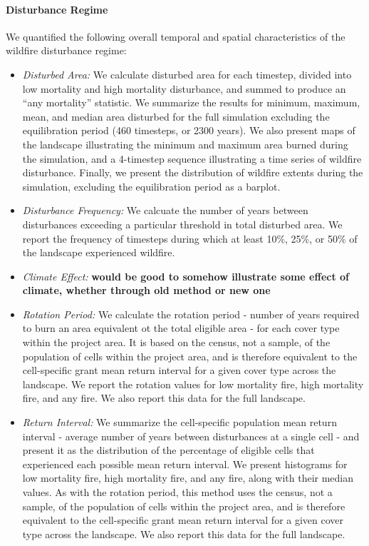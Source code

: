 \paragraph{Disturbance Regime} We quantified the following overall temporal and spatial characteristics of the wildfire disturbance regime:
\begin{itemize}
	\item \emph{Disturbed Area:} We calculate disturbed area for each timestep, divided into low mortality and high mortality disturbance, and summed to produce an ``any mortality'' statistic. We summarize the results for minimum, maximum, mean, and median area disturbed for the full simulation excluding the equilibration period (460 timesteps, or 2300 years). We also present maps of the landscape illustrating the minimum and maximum area burned during the simulation, and a 4-timestep sequence illustrating a time series of wildfire disturbance. Finally, we present the distribution of wildfire extents during the simulation, excluding the equilibration period as a barplot.
	\item \emph{Disturbance Frequency:} We calcuate the number of years between disturbances exceeding a particular threshold in total disturbed area. We report the frequency of timesteps during which at least 10\%, 25\%, or 50\% of the landscape experienced wildfire.
	\item \emph{Climate Effect:} \textbf{would be good to somehow illustrate some effect of climate, whether through old method or new one}
	\item \emph{Rotation Period:} We calculate the rotation period - number of years required to burn an area equivalent ot the total eligible area - for each cover type within the project area. It is based on the census, not a sample, of the population of cells within the project area, and is therefore equivalent to the cell-specific grant mean return interval for a given cover type across the landscape. We report the rotation values for low mortality fire, high mortality fire, and any fire. We also report this data for the full landscape.
	\item \emph{Return Interval:} We summarize the cell-specific population mean return interval - average number of years between disturbances at a single cell - and present it as the distribution of the percentage of eligible cells that experienced each possible mean return interval. We present histograms for low mortality fire, high mortality fire, and any fire, along with their median values. As with the rotation period, this method uses the census, not a sample, of the population of cells within the project area, and is therefore equivalent to the cell-specific grant mean return interval for a given cover type across the landscape. We also report this data for the full landscape.
\end{itemize}

